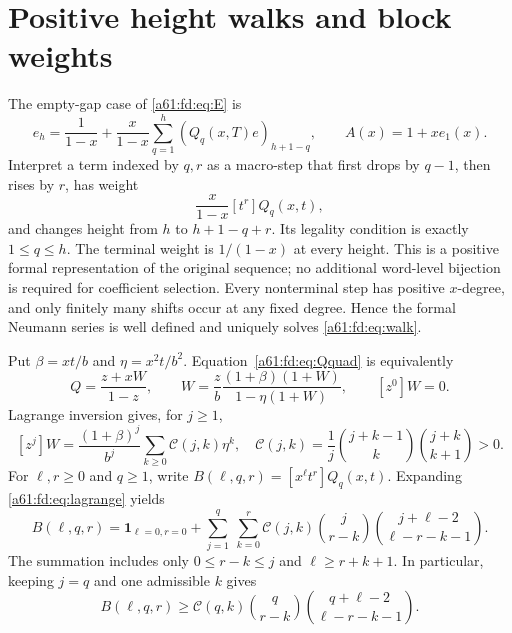 \documentclass[11pt,letterpaper]{article}
\numberwithin{equation}{section}
\theoremstyle{remark}\newtheorem{remark}[theorem]{Remark}
\newcommand{\one}{\mathbf 1}
\begin{document}
\section{Positive height walks and block weights}\label{a61:fd:sec:walk}
The empty-gap case of \eqref{a61:fd:eq:E} is
\begin{equation}\label{a61:fd:eq:walk}
 e_h=\frac1{1-x}+\frac{x}{1-x}\sum_{q=1}^h(Q_q(x,T)e)_{h+1-q},
 \qquad A(x)=1+xe_1(x).
\end{equation}
Interpret a term indexed by $q,r$ as a macro-step that first drops by $q-1$, then rises by $r$, has weight
\[
 \frac{x}{1-x}[t^r]Q_q(x,t),
\]
and changes height from $h$ to $h+1-q+r$. Its legality condition is exactly $1\le q\le h$. The terminal weight is $1/(1-x)$ at every height. This is a positive formal representation of the original sequence; no additional word-level bijection is required for coefficient selection. Every nonterminal step has positive $x$-degree, and only finitely many shifts occur at any fixed degree. Hence the formal Neumann series is well defined and uniquely solves \eqref{a61:fd:eq:walk}.

Put $\beta=xt/b$ and $\eta=x^2t/b^2$. Equation~\eqref{a61:fd:eq:Qquad} is equivalently
\begin{equation}\label{a61:fd:eq:W}
 Q=\frac{z+xW}{1-z},\qquad
 W=\frac{z}{b}\frac{(1+\beta)(1+W)}{1-\eta(1+W)},\qquad [z^0]W=0.
\end{equation}
Lagrange inversion gives, for $j\ge1$,
\begin{equation}\label{a61:fd:eq:lagrange}
 [z^j]W=\frac{(1+\beta)^j}{b^j}
 \sum_{k\ge0}\mathcal C(j,k)\eta^k,
 \quad \mathcal C(j,k)=\frac1j\binom{j+k-1}{k}\binom{j+k}{k+1}>0.
\end{equation}
For $\ell,r\ge0$ and $q\ge1$, write $B(\ell,q,r)=[x^\ell t^r]Q_q(x,t)$. Expanding \eqref{a61:fd:eq:lagrange} yields
\begin{equation}\label{a61:fd:eq:blockexact}
 B(\ell,q,r)=\one_{\ell=0,r=0}
 +\sum_{j=1}^q\ \sum_{k=0}^r
 \mathcal C(j,k)\binom{j}{r-k}
 \binom{j+\ell-2}{\ell-r-k-1}.
\end{equation}
The summation includes only $0\le r-k\le j$ and $\ell\ge r+k+1$. In particular, keeping $j=q$ and one admissible $k$ gives
\begin{equation}\label{a61:fd:eq:blocklower}
 B(\ell,q,r)\ge\mathcal C(q,k)\binom{q}{r-k}
 \binom{q+\ell-2}{\ell-r-k-1}.
\end{equation}
\end{document}
